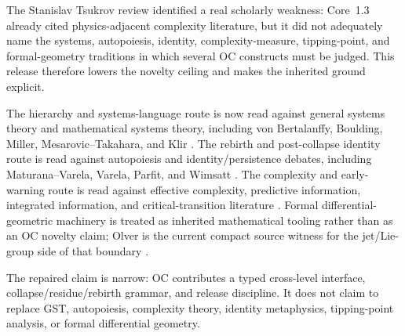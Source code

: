 The Stanislav Tsukrov review identified a real scholarly weakness: Core~1.3
already cited physics-adjacent complexity literature, but it did not adequately
name the systems, autopoiesis, identity, complexity-measure, tipping-point, and
formal-geometry traditions in which several OC constructs must be judged. This
release therefore lowers the novelty ceiling and makes the inherited ground
explicit.

The hierarchy and systems-language route is now read against general systems
theory and mathematical systems theory, including von Bertalanffy,
Boulding, Miller, Mesarovic--Takahara, and Klir
\cite{bertalanffy_general_system_theory,boulding_general_systems_theory,miller_living_systems,mesarovic_takahara_general_systems,klir_architecture_systems}.
The rebirth and post-collapse identity route is read against autopoiesis and
identity/persistence debates, including Maturana--Varela, Varela, Parfit, and
Wimsatt \cite{maturana_varela_autopoiesis,varela_biological_autonomy,parfit_reasons_persons,wimsatt_reductionism_levels}.
The complexity and early-warning route is read against effective complexity,
predictive information, integrated information, and critical-transition
literature \cite{gell_mann_effective_complexity,bialek_predictability_complexity,tononi_information_integration,scheffer_critical_transitions,dakos_early_warning}.
Formal differential-geometric machinery is treated as inherited mathematical
tooling rather than as an OC novelty claim; Olver is the current compact source
witness for the jet/Lie-group side of that boundary \cite{olver_lie_groups}.

The repaired claim is narrow: OC contributes a typed cross-level interface,
collapse/residue/rebirth grammar, and release discipline. It does not claim to
replace GST, autopoiesis, complexity theory, identity metaphysics, tipping-point
analysis, or formal differential geometry.
